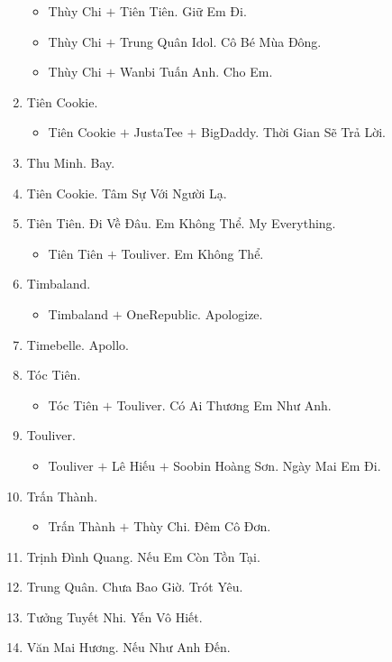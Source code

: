 \documentclass{article}
\begin{document}
\begin{enumerate}
\begin{itemize}
		\item {\sc Thùy Chi $+$ Tiên Tiên.} Giữ Em Đi.
		\item {\sc Thùy Chi $+$ Trung Quân Idol.} Cô Bé Mùa Đông.
		\item {\sc Thùy Chi $+$ Wanbi Tuấn Anh.} Cho Em.
	\end{itemize}
	\item {\sc Tiên Cookie.}
	\begin{itemize}
		\item {\sc Tiên Cookie $+$ JustaTee $+$ BigDaddy.} Thời Gian Sẽ Trả Lời.
	\end{itemize}
	\item {\sc Thu Minh.} Bay.
	\item {\sc Tiên Cookie.} Tâm Sự Với Người Lạ.
	\item {\sc Tiên Tiên.} Đi Về Đâu. Em Không Thể. My Everything.
	\begin{itemize}
		\item {\sc Tiên Tiên $+$ Touliver.} Em Không Thể.
	\end{itemize}
	\item {\sc Timbaland.}
	\begin{itemize}
		\item {\sc Timbaland $+$ OneRepublic.} Apologize.
	\end{itemize}
	\item {\sc Timebelle.} Apollo.
	\item {\sc Tóc Tiên.}
	\begin{itemize}
		\item {\sc Tóc Tiên $+$ Touliver.} Có Ai Thương Em Như Anh.
	\end{itemize}
	\item {\sc Touliver.}
	\begin{itemize}
		\item {\sc Touliver $+$ Lê Hiếu $+$ Soobin Hoàng Sơn.} Ngày Mai Em Đi.
	\end{itemize}
	\item {\sc Trấn Thành.}
	\begin{itemize}
		\item {\sc Trấn Thành $+$ Thùy Chi.} Đêm Cô Đơn.
	\end{itemize}
	\item {\sc Trịnh Đình Quang.} Nếu Em Còn Tồn Tại.
	\item {\sc Trung Quân.} Chưa Bao Giờ. Trót Yêu.
	\item {\sc Tưởng Tuyết Nhi.} Yến Vô Hiết.
	\item {\sc Văn Mai Hương.} Nếu Như Anh Đến.

\end{enumerate}
\end{document}
